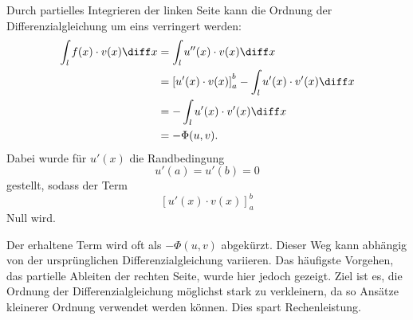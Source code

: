 Durch partielles Integrieren der linken Seite kann die Ordnung der Differenzialgleichung um eins verringert werden:
\begin{align*}
    \int_l f(x) \cdot v(x) \diff x &= \int_l u''(x) \cdot v(x) \diff x \\
                                 &= \left[ u'(x) \cdot v(x) \right]_{a}^{b} - \int_l u'(x) \cdot v'(x) \diff x \\
                                 &= - \int_l u'(x) \cdot v'(x) \diff x \\
                                 &= - \Phi(u, v).
\end{align*}
Dabei wurde für $u'(x)$ die Randbedingung
\begin{equation*}
    u'(a) = u'(b) = 0
\end{equation*}
gestellt, sodass der Term
\begin{equation*}
    \left[ u'(x) \cdot v(x) \right]_{a}^{b}
\end{equation*}
Null wird.

Der erhaltene Term wird oft als $-\Phi(u, v)$ abgekürzt.
Dieser Weg kann abhängig von der ursprünglichen Differenzialgleichung variieren.
Das häufigste Vorgehen, das partielle Ableiten der rechten Seite, wurde hier jedoch gezeigt.
Ziel ist es, die Ordnung der Differenzialgleichung möglichst stark zu verkleinern, da so Ansätze kleinerer Ordnung verwendet werden können.
Dies spart Rechenleistung.



